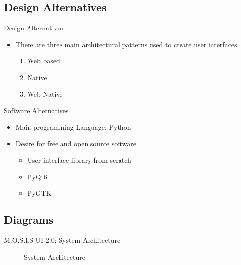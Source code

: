 \documentclass[17pt, aspectratio=169]{beamer}
\begin{document}
\subsection*{Design Alternatives}
\begin{frame}{Design Alternatives}
	\begin{itemize}
		\item There are three main architectural patterns used to create user interfaces
		      \begin{enumerate}
			      \item Web based
			      \item Native
			      \item Web-Native
		      \end{enumerate}
	\end{itemize}
\end{frame}
\begin{frame}{Software Alternatives}
	\begin{itemize}
		\item Main programming Language: Python
		\item Desire for free and open source software
		      \begin{itemize}
			      \item User interface library from scratch
			      \item PyQt6
			      \item PyGTK
		      \end{itemize}
	\end{itemize}
\end{frame}
\subsection*{Diagrams}
\begin{frame}{M.O.S.I.S UI 2.0: System Architecture}
	\begin{figure}
		\caption{System Architecture}
	\end{figure}
\end{frame}
\end{document}
